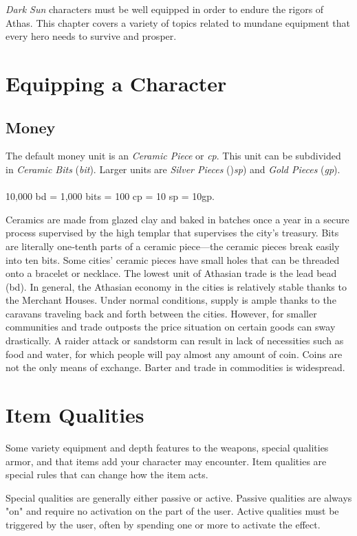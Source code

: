 \begin{multicols}{2}

\textit{Dark Sun} characters must be well equipped in order to
endure the rigors of Athas. This chapter covers a variety
of topics related to mundane equipment that every hero
needs to survive and prosper.

\section{Equipping a Character}
\subsection{Money}
The default money unit is an \textit{Ceramic Piece} or \textit{cp}. This
unit can be subdivided in \textit{Ceramic Bits} (\textit{bit}). Larger units
are \textit{Silver Pieces} ()\textit{sp}) and \textit{Gold Pieces}
(\textit{gp}).\\
\\
10,000 bd = 1,000 bits = 100 cp = 10 sp = 10gp.

Ceramics are made from glazed clay and baked in batches once a year in a secure
process supervised by the high templar that supervises the city’s treasury. Bits
are literally one‐tenth parts of a ceramic piece—the ceramic pieces break easily
into ten bits. Some cities’ ceramic pieces have small holes that can be threaded
onto a bracelet or necklace. The lowest unit of Athasian trade is the lead bead
(bd).  In general, the Athasian economy in the cities is relatively stable thanks
to the Merchant Houses. Under normal conditions, supply is ample thanks to the
caravans traveling back and forth between the cities. However, for smaller
communities and trade outposts the price situation on certain goods can sway
drastically. A raider attack or sandstorm can result in lack of necessities such
as food and water, for which people will pay almost any amount of coin. Coins
are not the only means of exchange. Barter and trade in commodities is widespread.

\section{Item Qualities}
Some variety equipment and depth features to the weapons, special qualities
armor, and that items add your character may encounter. Item qualities are
special rules that can change how the item acts.

Special qualities are generally either passive or active. Passive qualities are
always "on" and require no activation on the part of the user. Active qualities
must be triggered by the user, often by spending one or more \advantage to
activate the effect.


\end{multicols}
